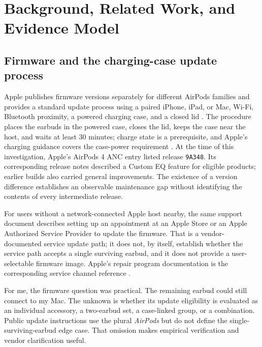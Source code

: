 \documentclass[11pt,letterpaper]{article}
\begin{document}
\section{Background, Related Work, and Evidence Model}\label{sec:background}
\subsection{Firmware and the charging-case update process}
Apple publishes firmware versions separately for different AirPods families and provides a standard update process using a paired iPhone, iPad, or Mac, Wi-Fi, Bluetooth proximity, a powered charging case, and a closed lid \cite{applefw}. The procedure places the earbuds in the powered case, closes the lid, keeps the case near the host, and waits at least 30 minutes; charge state is a prerequisite, and Apple's charging guidance covers the case-power requirement \cite{applecharge}. At the time of this investigation, Apple's AirPods 4 ANC entry listed release \texttt{9A348}. Its corresponding release notes described a Custom EQ feature for eligible products; earlier builds also carried general improvements. The existence of a version difference establishes an observable maintenance gap without identifying the contents of every intermediate release.

For users without a network-connected Apple host nearby, the same support document describes setting up an appointment at an Apple Store or an Apple Authorized Service Provider to update the firmware. That is a vendor-documented service update path; it does not, by itself, establish whether the service path accepts a single surviving earbud, and it does not provide a user-selectable firmware image. Apple's repair program documentation is the corresponding service channel reference \cite{applehelp}.

For me, the firmware question was practical. The remaining earbud could still connect to my Mac. The unknown is whether its update eligibility is evaluated as an individual accessory, a two-earbud set, a case-linked group, or a combination. Public update instructions use the plural \emph{AirPods} but do not define the single-surviving-earbud edge case. That omission makes empirical verification and vendor clarification useful.
\end{document}
